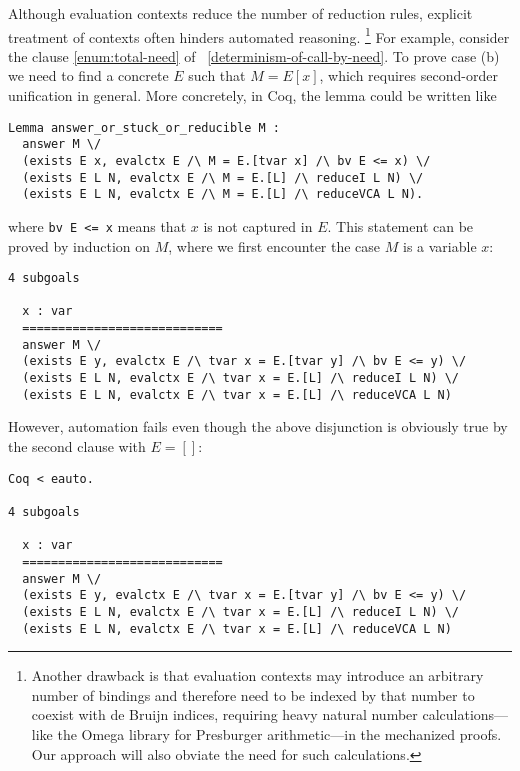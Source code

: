 \documentclass{llncs}
\begin{document}
Although evaluation contexts reduce the number of reduction rules,
explicit treatment of contexts often hinders automated reasoning.%
\footnote{\label{the-footnote}Another drawback is that evaluation contexts may introduce an arbitrary number of bindings and therefore need to be indexed by that number to coexist with de Bruijn indices,
requiring heavy natural number calculations---like the Omega \cite{Coq:manual} library for Presburger arithmetic---in the mechanized proofs.
Our approach will also obviate the need for such calculations.}
For example, consider the clause \ref{enum:total-need} of \lemmaname~\ref{determinism-of-call-by-need}.
To prove case (b) %
we need to find a concrete $E$ such that $M=E[x]$, which requires second-order unification \cite{Goldfarb81} in general.  More concretely, in Coq, the lemma could be written like
\begin{verbatim}
Lemma answer_or_stuck_or_reducible M :
  answer M \/
  (exists E x, evalctx E /\ M = E.[tvar x] /\ bv E <= x) \/
  (exists E L N, evalctx E /\ M = E.[L] /\ reduceI L N) \/
  (exists E L N, evalctx E /\ M = E.[L] /\ reduceVCA L N).
\end{verbatim}
where \verb|bv E <= x| means that $x$ is not captured in $E$.
This statement can be proved by induction on $M$, where we first encounter the case $M$ is a variable $x$:
\begin{verbatim}
4 subgoals

  x : var
  ============================
  answer M \/
  (exists E y, evalctx E /\ tvar x = E.[tvar y] /\ bv E <= y) \/
  (exists E L N, evalctx E /\ tvar x = E.[L] /\ reduceI L N) \/
  (exists E L N, evalctx E /\ tvar x = E.[L] /\ reduceVCA L N)
\end{verbatim}
However, automation fails even though the above disjunction is obviously true by the second clause with $E = []$:
\begin{verbatim}
Coq < eauto.

4 subgoals

  x : var
  ============================
  answer M \/
  (exists E y, evalctx E /\ tvar x = E.[tvar y] /\ bv E <= y) \/
  (exists E L N, evalctx E /\ tvar x = E.[L] /\ reduceI L N) \/
  (exists E L N, evalctx E /\ tvar x = E.[L] /\ reduceVCA L N)
\end{verbatim}
\end{document}
